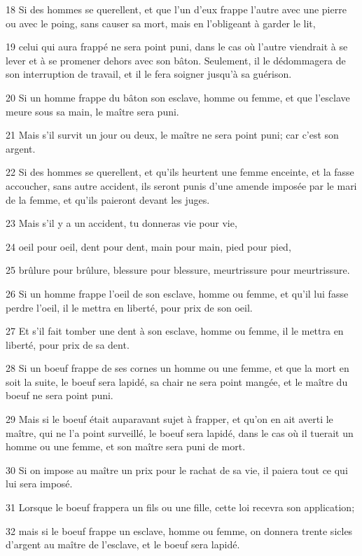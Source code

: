 \par 18 Si des hommes se querellent, et que l'un d'eux frappe l'autre avec une pierre ou avec le poing, sans causer sa mort, mais en l'obligeant à garder le lit,
\par 19 celui qui aura frappé ne sera point puni, dans le cas où l'autre viendrait à se lever et à se promener dehors avec son bâton. Seulement, il le dédommagera de son interruption de travail, et il le fera soigner jusqu'à sa guérison.
\par 20 Si un homme frappe du bâton son esclave, homme ou femme, et que l'esclave meure sous sa main, le maître sera puni.
\par 21 Mais s'il survit un jour ou deux, le maître ne sera point puni; car c'est son argent.
\par 22 Si des hommes se querellent, et qu'ils heurtent une femme enceinte, et la fasse accoucher, sans autre accident, ils seront punis d'une amende imposée par le mari de la femme, et qu'ils paieront devant les juges.
\par 23 Mais s'il y a un accident, tu donneras vie pour vie,
\par 24 oeil pour oeil, dent pour dent, main pour main, pied pour pied,
\par 25 brûlure pour brûlure, blessure pour blessure, meurtrissure pour meurtrissure.
\par 26 Si un homme frappe l'oeil de son esclave, homme ou femme, et qu'il lui fasse perdre l'oeil, il le mettra en liberté, pour prix de son oeil.
\par 27 Et s'il fait tomber une dent à son esclave, homme ou femme, il le mettra en liberté, pour prix de sa dent.
\par 28 Si un boeuf frappe de ses cornes un homme ou une femme, et que la mort en soit la suite, le boeuf sera lapidé, sa chair ne sera point mangée, et le maître du boeuf ne sera point puni.
\par 29 Mais si le boeuf était auparavant sujet à frapper, et qu'on en ait averti le maître, qui ne l'a point surveillé, le boeuf sera lapidé, dans le cas où il tuerait un homme ou une femme, et son maître sera puni de mort.
\par 30 Si on impose au maître un prix pour le rachat de sa vie, il paiera tout ce qui lui sera imposé.
\par 31 Lorsque le boeuf frappera un fils ou une fille, cette loi recevra son application;
\par 32 mais si le boeuf frappe un esclave, homme ou femme, on donnera trente sicles d'argent au maître de l'esclave, et le boeuf sera lapidé.
